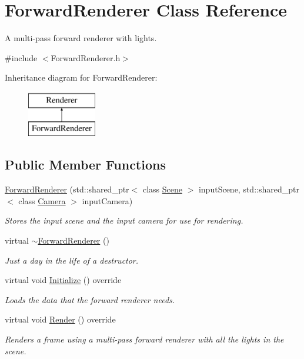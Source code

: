 \hypertarget{class_forward_renderer}{}\section{Forward\+Renderer Class Reference}
\label{class_forward_renderer}


A multi-\/pass forward renderer with lights.




{\ttfamily \#include $<$Forward\+Renderer.\+h$>$}

Inheritance diagram for Forward\+Renderer\+:\begin{figure}[H]
\begin{center}
\leavevmode
\includegraphics[height=2.000000cm]{class_forward_renderer}
\end{center}
\end{figure}
\subsection*{Public Member Functions}
\begin{DoxyCompactItemize}
\item
\hyperlink{class_forward_renderer_af8ed84e45085c4dc60d565fcc3c198d1}{Forward\+Renderer} (std\+::shared\+\_\+ptr$<$ class \hyperlink{class_scene}{Scene} $>$ input\+Scene, std\+::shared\+\_\+ptr$<$ class \hyperlink{class_camera}{Camera} $>$ input\+Camera)
\begin{DoxyCompactList}\small\item\em Stores the input scene and the input camera for use for rendering. \end{DoxyCompactList}\item
virtual \hyperlink{class_forward_renderer_ab27ea6139730631d79488cec3c564597}{$\sim$\+Forward\+Renderer} ()
\begin{DoxyCompactList}\small\item\em Just a day in the life of a destructor. \end{DoxyCompactList}\item
virtual void \hyperlink{class_forward_renderer_a5cbca647822780d6cfbd39552d73ee06}{Initialize} () override
\begin{DoxyCompactList}\small\item\em Loads the data that the forward renderer needs. \end{DoxyCompactList}\item 
virtual void \hyperlink{class_forward_renderer_a1a5deafa5deaf1e0abaab0e2074928c1}{Render} () override
\begin{DoxyCompactList}\small\item\em Renders a frame using a multi-\/pass forward renderer with all the lights in the scene. \end{DoxyCompactList}\end{DoxyCompactItemize}
